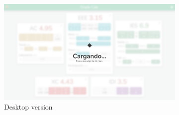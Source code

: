 \begin{figure}[ht!]
    \begin{subfigure}[b]{0.757\textwidth-0.1cm}
        \centering
        \includegraphics[frame,width=\textwidth]{media/screenshots/screenshot-froozen-long-pc.png}
        \caption{Desktop version}
    \end{subfigure}
    \hfill
    \begin{subfigure}[b]{0.243\textwidth-0.1cm}
        \centering

\end{subfigure}
\end{figure}
